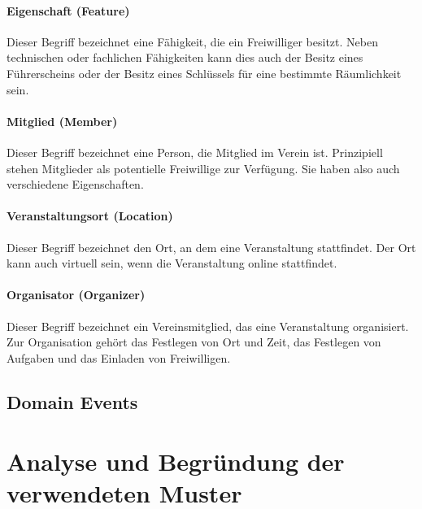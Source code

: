 \paragraph{\glqq Eigenschaft\grqq{} (Feature)}
Dieser Begriff bezeichnet eine Fähigkeit, die ein Freiwilliger besitzt. Neben technischen oder fachlichen Fähigkeiten kann dies auch der Besitz eines Führerscheins oder der Besitz eines Schlüssels für eine bestimmte Räumlichkeit sein.

\paragraph{\glqq Mitglied\grqq{} (Member)}
Dieser Begriff bezeichnet eine Person, die Mitglied im Verein ist. Prinzipiell stehen Mitglieder als potentielle Freiwillige zur Verfügung. Sie haben also auch verschiedene Eigenschaften.

\paragraph{\glqq Veranstaltungsort\grqq{} (Location)}
Dieser Begriff bezeichnet den Ort, an dem eine Veranstaltung stattfindet. Der Ort kann auch \glqq virtuell\grqq{} sein, wenn die Veranstaltung online stattfindet.

\paragraph{\glqq Organisator\grqq{} (Organizer)}
Dieser Begriff bezeichnet ein Vereinsmitglied, das eine Veranstaltung organisiert. Zur Organisation gehört das Festlegen von Ort und Zeit, das Festlegen von Aufgaben und das Einladen von Freiwilligen.

\subsection{Domain Events}

\section{Analyse und Begründung der verwendeten Muster}
\label{section:analyse_und_begrundung_der_verwendeten_muster}
